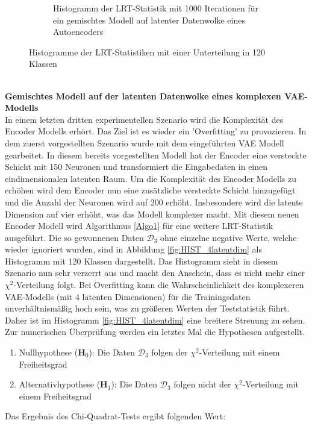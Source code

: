 \documentclass[%
thesis=student,%
coverpage=false,%
titlepage=false,%
headmarks=true, %
german,%
font=libertine, %
math=newpxtx, %
BCOR=5mm,%
coverBCOR=11mm%
]{tumbook}
\theoremstyle{break}
\begin{document}
\begin{figure}[h]
\begin{subfigure}[b]{0.45\textwidth}
		\caption{Histogramm der LRT-Statistik mit 1000 Iterationen für ein gemischtes Modell auf latenter Datenwolke eines Autoencoders}
		\label{fig:HIST_Autoencoder}
	\end{subfigure}
	\caption{Histogramme der LRT-Statistiken mit einer Unterteilung in 120 Klassen}
	\label{fig:LRT_HIST2}
\end{figure}
\\
\textbf{Gemischtes Modell auf der latenten Datenwolke eines komplexen VAE-Modells}\\
In einem letzten dritten experimentellen Szenario wird die Komplexität des Encoder Modells erhört. Das Ziel ist es wieder ein 'Overfitting' zu provozieren. In dem zuerst vorgestellten Szenario wurde mit dem eingeführten VAE Modell gearbeitet. In diesem bereits vorgestellten Modell hat der Encoder eine versteckte Schicht mit 150 Neuronen und transformiert die Eingabedaten in einen eindimensionalen latenten Raum. Um die Komplexität des Encoder Modells zu erhöhen wird dem Encoder nun eine zusätzliche versteckte Schicht hinzugefügt und die Anzahl der Neuronen wird auf 200 erhöht. Insbesondere wird die latente Dimension auf vier erhöht, was das Modell komplexer macht. Mit diesem neuen Encoder Modell wird Algorithmus \ref{Algo1} für eine weitere LRT-Statistik ausgeführt. Die so gewonnenen Daten $\mathcal{D}_3$ ohne einzelne negative Werte, welche wieder ignoriert wurden, sind in Abbildung \ref{fig:HIST_4latentdim} als Histogramm mit 120 Klassen dargestellt. Das Histogramm sieht in diesem Szenario nun sehr verzerrt aus und macht den Anschein, dass es nicht mehr einer $\chi^2$-Verteilung folgt. Bei Overfitting kann die Wahrscheinlichkeit des komplexeren VAE-Modells (mit 4 latenten Dimensionen) für die Trainingsdaten unverhältnismäßig hoch sein, was zu größeren Werten der Teststatistik führt. Daher ist im Histogramm \ref{fig:HIST_4latentdim} eine breitere Streuung zu sehen. Zur numerischen Überprüfung werden ein letztes Mal die Hypothesen aufgestellt. \\
\begin{enumerate}
	\item Nullhypothese ($\mathbf{H}_0$): Die Daten $\mathcal{D}_3$ folgen der $\chi^2$-Verteilung mit einem Freiheitsgrad\\
	\item Alternativhypothese ($\mathbf{H}_1$): Die Daten $\mathcal{D}_3$ folgen nicht der $\chi^2$-Verteilung mit einem Freiheitsgrad \\
\end{enumerate} 
Das Ergebnis des Chi-Quadrat-Tests ergibt folgenden Wert:
\end{document}

